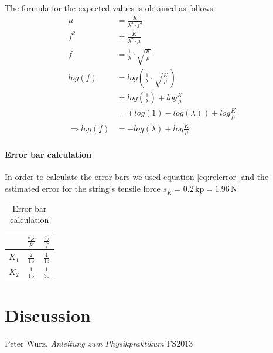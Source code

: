 \documentclass{scrreprt}
\newcommand{\unit}[1]{\ensuremath{\, \mathrm{#1}}}
\begin{document}
The formula for the expected values is obtained as follows:
\begin{align}
\mu &= \frac{K}{\lambda^2 \cdot f^2}\\
f^2 &= \frac{K}{\lambda^2\cdot\mu}\\
f &= \frac{1}{\lambda}\cdot\sqrt{\frac{K}{\mu}}\\
log(f) &= log\left(\frac{1}{\lambda}\cdot\sqrt{\frac{K}{\mu}}\right)\\
&=log\left(\frac{1}{\lambda}\right) + log\frac{K}{\mu}\\
&=\left(log(1) - log(\lambda)\right) + log\frac{K}{\mu}\\
\Rightarrow log(f) &=-log(\lambda) + log\frac{K}{\mu}
\end{align}

\paragraph*{Error bar calculation} In order to calculate the error bars we used equation \ref{eq:relerror} and the estimated error for the string's tensile force $s_{\overline{K}}=0.2 \unit{kp} = 1.96 \unit{N}$:

\begin{table}[H]
\center
\begin{tabular}{|c|cc|}
\cline{2-3}
\multicolumn{1}{c|}{}& \tiny $\frac{s_{\overline{K}}}{\overline{K}}$ & \tiny$\frac{s_{\bar{f}}}{\bar{f}}$\\ \hline
$K_1$ & \small$\frac{2}{15}$ & \small$\frac{1}{15}$ \\ \hline
$K_2$ & \small$\frac{1}{15}$ & \small$\frac{1}{30}$\\ \hline
\end{tabular}
\caption{Error bar calculation}
\end{table}


\section{Discussion}

\begin{thebibliography}{9}

  Peter Wurz,
  \emph{Anleitung zum Physikpraktikum}
  FS2013

\end{thebibliography}
\end{document}
